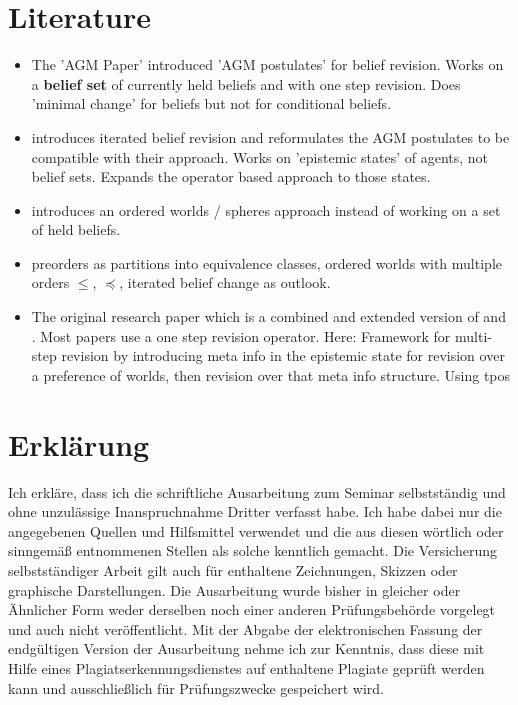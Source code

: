 \documentclass[11pt]{article}
\begin{document}
\section{Literature}
\begin{itemize}
    \item The 'AGM Paper' \cite{Alchourron1985} introduced 'AGM postulates' for belief revision. Works on a \textbf{belief set} of currently held beliefs and with one step revision. Does 'minimal change' for beliefs but not for conditional beliefs.
    \item \cite{Darwiche1997} introduces iterated belief revision and reformulates the AGM postulates to be compatible with their approach. Works on 'epistemic states' of agents, not belief sets. Expands the operator based approach to those states.
    \item \cite{Grove1988} introduces an ordered worlds / spheres approach instead of working on a set of held beliefs.
    \item \cite{Booth2004} preorders as partitions into equivalence classes, ordered worlds with multiple orders $\leq$, $\preceq$, iterated belief change as outlook.
    \item The original research paper \cite{Booth2011} which is a combined and extended version of \cite{Booth2006} and \cite{Booth2007}. Most papers use a one step revision operator. Here: Framework for multi-step revision by introducing meta info in the epistemic state for revision over a preference of worlds, then revision over that meta info structure. Using \gls{tpos}
\end{itemize}

\newpage

\printglossaries

\newpage




\newpage

\section{Erklärung}
Ich erkläre, dass ich die schriftliche Ausarbeitung zum Seminar selbstständig und ohne unzulässige Inanspruchnahme Dritter verfasst habe. Ich habe dabei nur die angegebenen Quellen und Hilfsmittel verwendet und die aus diesen wörtlich oder sinngemäß entnommenen Stellen als solche kenntlich gemacht. Die Versicherung selbstständiger Arbeit gilt auch für enthaltene Zeichnungen, Skizzen oder graphische Darstellungen. Die Ausarbeitung wurde bisher in gleicher oder Ähnlicher Form weder derselben noch einer anderen Prüfungsbehörde vorgelegt und auch nicht veröffentlicht. Mit der Abgabe der elektronischen Fassung der endgültigen Version der Ausarbeitung nehme ich zur Kenntnis, dass diese mit Hilfe eines Plagiatserkennungsdienstes auf enthaltene Plagiate geprüft werden kann und ausschließlich für Prüfungszwecke gespeichert wird.
\end{document}
